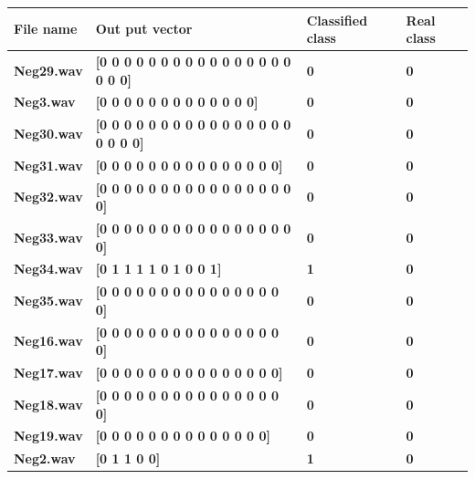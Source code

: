 \documentclass[12pt]{article}
\numberwithin{figure}{section}
\numberwithin{table}{section}
\begin{document}
\begin{table}[H]
\centering
\begin{tabular}{|m{}|m{}|m{}|m{}|} 
\hline
\bf {File name} &  \bf{Out put vector} & \bf{Classified class} & \bf{Real class}\\
\hline
\bf {Neg29.wav} &  {\bf{[0 0 0 0 0 0 0 0 0 0 0 0 0 0 0 0 0 0 0]}} &  {\bf{0}} &  {\bf{0}} \\ \hline
\bf {Neg3.wav} &  {\bf{[0 0 0 0 0 0 0 0 0 0 0 0 0]}} &  {\bf{0}} &  {\bf{0}} \\ \hline
\bf {Neg30.wav} &  {\bf{[0 0 0 0 0 0 0 0 0 0 0 0 0 0 0 0 0 0 0 0]}} &  {\bf{0}} &  {\bf{0}} \\ \hline
\bf {Neg31.wav} &  {\bf{[0 0 0 0 0 0 0 0 0 0 0 0 0 0 0]}} &  {\bf{0}} &  {\bf{0}} \\ \hline
\bf {Neg32.wav} &  {\bf{[0 0 0 0 0 0 0 0 0 0 0 0 0 0 0 0 0]}} &  {\bf{0}} &  {\bf{0}} \\ \hline
\bf {Neg33.wav} &  {\bf{[0 0 0 0 0 0 0 0 0 0 0 0 0 0 0 0 0]}} &  {\bf{0}} &  {\bf{0}} \\ \hline
\bf {Neg34.wav} &  {\bf{[0 1 1 1 1 0 1 0 0 1]}} &  {\bf{1}} &  {\bf{0}} \\ \hline
\bf {Neg35.wav} &  {\bf{[0 0 0 0 0 0 0 0 0 0 0 0 0 0 0 0]}} &  {\bf{0}} &  {\bf{0}} \\ \hline
\bf {Neg16.wav} &  {\bf{[0 0 0 0 0 0 0 0 0 0 0 0 0 0 0 0]}} &  {\bf{0}} &  {\bf{0}} \\ \hline
\bf {Neg17.wav} &  {\bf{[0 0 0 0 0 0 0 0 0 0 0 0 0 0 0]}} &  {\bf{0}} &  {\bf{0}} \\ \hline
\bf {Neg18.wav} &  {\bf{[0 0 0 0 0 0 0 0 0 0 0 0 0 0 0 0]}} &  {\bf{0}} &  {\bf{0}} \\ \hline
\bf {Neg19.wav} &  {\bf{[0 0 0 0 0 0 0 0 0 0 0 0 0 0]}} &  {\bf{0}} &  {\bf{0}} \\ \hline
\bf {Neg2.wav} &  {\bf{[0 1 1 0 0]}} &  {\bf{1}} &  {\bf{0}} \\ \hline

\end{tabular}
\end{table}
\end{document}
